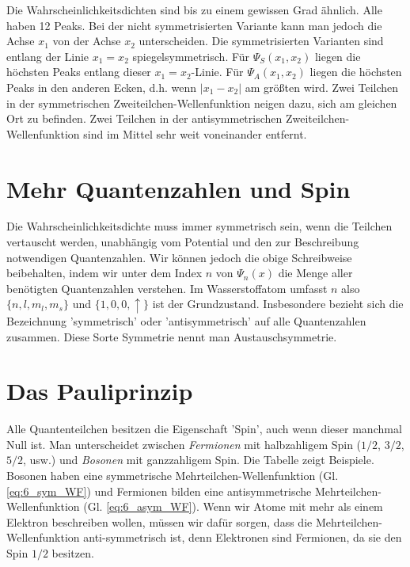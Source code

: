 Die Wahrscheinlichkeitsdichten sind bis zu einem gewissen Grad ähnlich. Alle haben 12 Peaks. Bei der nicht symmetrisierten Variante kann man jedoch die Achse $x_1$ von der Achse $x_2$ unterscheiden.
Die symmetrisierten Varianten sind entlang der Linie $x_1 = x_2$ spiegelsymmetrisch. Für $\Psi_S(x_1, x_2)$ liegen die höchsten Peaks entlang dieser $x_1 = x_2$-Linie. Für $\Psi_A(x_1, x_2)$ liegen die höchsten Peaks in den anderen Ecken, d.h. wenn $|x_1 - x_2|$ am größten wird. Zwei Teilchen in der symmetrischen Zweiteilchen-Wellenfunktion neigen dazu, sich am gleichen Ort zu befinden. Zwei Teilchen in der antisymmetrischen Zweiteilchen-Wellenfunktion sind im Mittel sehr weit voneinander entfernt.


\section{Mehr Quantenzahlen und Spin}

Die Wahrscheinlichkeitsdichte muss immer symmetrisch sein, wenn die Teilchen vertauscht werden, unabhängig vom Potential und den zur Beschreibung notwendigen Quantenzahlen. Wir können jedoch die obige Schreibweise beibehalten, indem wir unter dem Index $n$ von $\Psi_n(x)$ die Menge aller benötigten Quantenzahlen verstehen. Im Wasserstoffatom umfasst $n$ also $\{ n, l, m_l, m_s \}$ und $\{ 1, 0, 0, \uparrow \}$ ist der Grundzustand. Insbesondere bezieht sich die Bezeichnung 'symmetrisch' oder 'antisymmetrisch' auf alle Quantenzahlen zusammen. Diese Sorte Symmetrie nennt man Austauschsymmetrie.



\section{Das Pauliprinzip}


Alle Quantenteilchen besitzen die Eigenschaft 'Spin', auch wenn dieser manchmal Null ist. Man unterscheidet zwischen \emph{Fermionen} mit halbzahligem Spin ($1/2$, $3/2$, $5/2$, usw.) und \emph{Bosonen} mit ganzzahligem Spin. Die Tabelle zeigt Beispiele. Bosonen haben eine symmetrische Mehr\-teil\-chen-Wellenfunktion (Gl. \ref{eq:6_sym_WF}) und Fermionen bilden eine antisymmetrische Mehrteilchen-Wellenfunktion (Gl. \ref{eq:6_asym_WF}). Wenn wir Atome mit mehr als einem Elektron beschreiben wollen, müssen wir dafür sorgen, dass die Mehrteilchen-Wellenfunktion anti-symmetrisch ist, denn Elektronen sind Fermionen, da sie den Spin $1/2$ besitzen.


